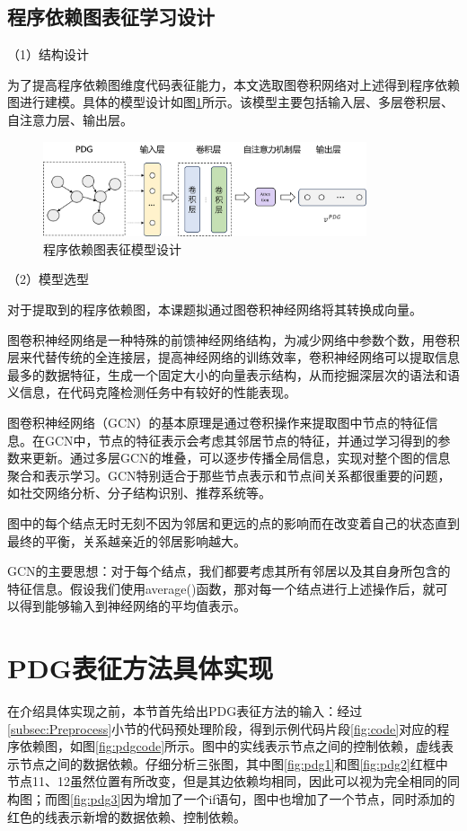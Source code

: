 \subsection{程序依赖图表征学习设计}
\label{subsec:PDGModel}

（1）结构设计

为了提高程序依赖图维度代码表征能力，本文选取图卷积网络对上述得到程序依赖图进行建模。具体的模型设计如图\ref{fig:pdgmodel}所示。该模型主要包括输入层、多层卷积层、自注意力层、输出层。
\begin{figure}[H]
  \centering
  \includegraphics[width=0.85\textwidth]{figures/pdgmodel.png}
  \caption{程序依赖图表征模型设计}\label{fig:pdgmodel}
\end{figure}

（2）模型选型


对于提取到的程序依赖图，本课题拟通过图卷积神经网络将其转换成向量。


图卷积神经网络是一种特殊的前馈神经网络结构，为减少网络中参数个数，用卷积层来代替传统的全连接层，提高神经网络的训练效率，卷积神经网络可以提取信息最多的数据特征，生成一个固定大小的向量表示结构，从而挖掘深层次的语法和语义信息，在代码克隆检测任务中有较好的性能表现。

图卷积神经网络（GCN）的基本原理是通过卷积操作来提取图中节点的特征信息。在GCN中，节点的特征表示会考虑其邻居节点的特征，并通过学习得到的参数来更新。通过多层GCN的堆叠，可以逐步传播全局信息，实现对整个图的信息聚合和表示学习。GCN特别适合于那些节点表示和节点间关系都很重要的问题，如社交网络分析、分子结构识别、推荐系统等。


图中的每个结点无时无刻不因为邻居和更远的点的影响而在改变着自己的状态直到最终的平衡，关系越亲近的邻居影响越大。

GCN的主要思想：对于每个结点，我们都要考虑其所有邻居以及其自身所包含的特征信息。假设我们使用average()函数，那对每一个结点进行上述操作后，就可以得到能够输入到神经网络的平均值表示。



\section{PDG表征方法具体实现}
\label{sec:PDGachieve}
在介绍具体实现之前，本节首先给出PDG表征方法的输入：经过\ref{subsec:Preprocess}小节的代码预处理阶段，得到示例代码片段\ref{fig:code}对应的程序依赖图，如图\ref{fig:pdgcode}所示。图中的实线表示节点之间的控制依赖，虚线表示节点之间的数据依赖。仔细分析三张图，其中图\ref{fig:pdg1}和图\ref{fig:pdg2}红框中节点11、12虽然位置有所改变，但是其边依赖均相同，因此可以视为完全相同的同构图；而图\ref{fig:pdg3}因为增加了一个if语句，图中也增加了一个节点，同时添加的红色的线表示新增的数据依赖、控制依赖。


